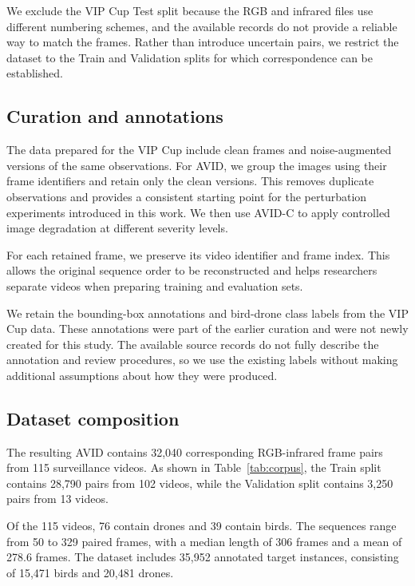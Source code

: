 \documentclass[10pt]{article}
\newcommand{\dataset}{\textsc{AVID}}
\newcommand{\corrupt}{\textsc{AVID-C}}
\begin{document}
We exclude the VIP Cup Test split because the RGB and infrared files use different numbering schemes, and the available records do not provide a reliable way to match the frames. Rather than introduce uncertain pairs, we restrict the dataset to the Train and Validation splits for which correspondence can be established.

\subsection{Curation and annotations}

The data prepared for the VIP Cup include clean frames and noise-augmented versions of the same observations. For \dataset{}, we group the images using their frame identifiers and retain only the clean versions. This removes duplicate observations and provides a consistent starting point for the perturbation experiments introduced in this work. We then use \corrupt{} to apply controlled image degradation at different severity levels.

For each retained frame, we preserve its video identifier and frame index. This allows the original sequence order to be reconstructed and helps researchers separate videos when preparing training and evaluation sets.

We retain the bounding-box annotations and bird-drone class labels from the VIP Cup data. These annotations were part of the earlier curation and were not newly created for this study. The available source records do not fully describe the annotation and review procedures, so we use the existing labels without making additional assumptions about how they were produced.

\subsection{Dataset composition}

The resulting \dataset{} contains 32,040 corresponding RGB-infrared frame pairs from 115 surveillance videos. As shown in Table~\ref{tab:corpus}, the Train split contains 28,790 pairs from 102 videos, while the Validation split contains 3,250 pairs from 13 videos.

Of the 115 videos, 76 contain drones and 39 contain birds. The sequences range from 50 to 329 paired frames, with a median length of 306 frames and a mean of 278.6 frames. The dataset includes 35,952 annotated target instances, consisting of 15,471 birds and 20,481 drones.
\end{document}
